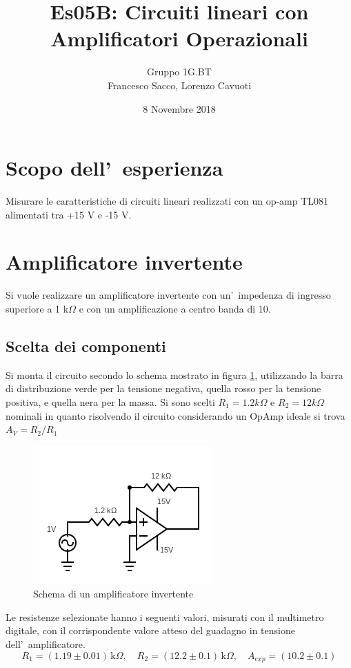 \documentclass[10pt,a4paper]{article}
\author{Gruppo 1G.BT \\ Francesco Sacco, Lorenzo Cavuoti}
\title{Es05B: Circuiti lineari con Amplificatori Operazionali}
\begin{document}
\date{8 Novembre 2018}
\maketitle


\section*{Scopo dell'~esperienza}
Misurare le caratteristiche di circuiti lineari realizzati con un op-amp TL081 alimentati tra +15 V e -15 V.

\section{Amplificatore invertente}
Si vuole realizzare un amplificatore invertente con un'~impedenza di ingresso superiore a 1 
k$\Omega$ e con un amplificazione a centro banda di 10.

\subsection{Scelta dei componenti}

Si monta il circuito secondo lo schema mostrato in figura \ref{fig:ampinv}, utilizzando la barra di 
distribuzione verde per la tensione negativa, quella rosso per la tensione positiva, e quella nera per 
la massa. Si sono scelti $R_1 = 1.2k\Omega$ e $R_2 = 12k\Omega$ nominali in quanto risolvendo il circuito considerando un OpAmp ideale si trova $A_V=R_2/R_1$

\begin{figure}[h]
\begin{center}
\includegraphics[width=0.4\linewidth]{circuit.png}
\caption{\small Schema di un amplificatore invertente}
\label{fig:ampinv}
\end{center}
\end{figure}
%

Le resistenze selezionate hanno i seguenti valori, misurati con il multimetro digitale, con il corrispondente valore atteso 
del guadagno in tensione dell'~amplificatore.
\[
R_1 = ( 1.19 \pm 0.01) \,\mathrm{k}\Omega, \quad 
R_2 = ( 12.2 \pm 0.1) \,\mathrm{k}\Omega, \quad 
A_{exp} = ( 10.2 \pm 0.1)
\]
\end{document}
